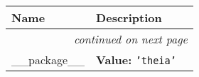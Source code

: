     \vspace{-1cm}
\hspace{\varindent}\begin{longtable}{|p{\varnamewidth}|p{\vardescrwidth}|l}
\cline{1-2}
\cline{1-2} \centering \textbf{Name} & \centering \textbf{Description}& \\
\cline{1-2}
\endhead\cline{1-2}\multicolumn{3}{r}{\small\textit{continued on next page}}\\\endfoot\cline{1-2}
\endlastfoot\raggedright \_\-\_\-p\-a\-c\-k\-a\-g\-e\-\_\-\_\- & \raggedright \textbf{Value:} 
{\tt \texttt{'}\texttt{theia}\texttt{'}}&\\
\cline{1-2}
\end{longtable}

